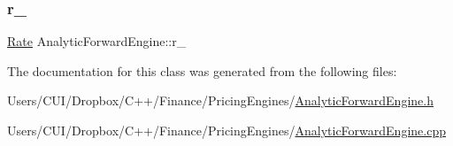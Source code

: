 \subsubsection{\texorpdfstring{r\+\_\+}{r\_}}
{\footnotesize\ttfamily \hyperlink{_name_def_8h_a25bee43a162de339c81f3d1caf6b887d}{Rate} Analytic\+Forward\+Engine\+::r\+\_\+\hspace{0.3cm}{\ttfamily [private]}}



The documentation for this class was generated from the following files\+:\begin{DoxyCompactItemize}
\item 
Users/\+C\+U\+I/\+Dropbox/\+C++/\+Finance/\+Pricing\+Engines/\hyperlink{_analytic_forward_engine_8h}{Analytic\+Forward\+Engine.\+h}\item 
Users/\+C\+U\+I/\+Dropbox/\+C++/\+Finance/\+Pricing\+Engines/\hyperlink{_analytic_forward_engine_8cpp}{Analytic\+Forward\+Engine.\+cpp}\end{DoxyCompactItemize}
